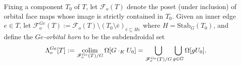 \documentclass[a4paper,10pt,draft]{article}%
\numberwithin{equation}{section}%
\numberwithin{figure}{section}
\begin{document}
\begin{definition}
Fixing a component $T_0$ of $T$,
      let $\mathscr{F}_{o}(T)$ denote the poset (under inclusion) of orbital face maps whose image is
      strictly contained in $T_0$.
      Given an inner edge $e \in T$, let
      $\mathscr{F}_{o}^{Ge}(T) := \mathscr{F}_{o}(T) \setminus (T_0\setminus \bar{e})_{\bar e \subseteq H e}$
      where $H = \mathrm{Stab}_G(T_0)$,
      and define the \textit{$Ge$-orbital horn} to be the subdendroidal set
      \begin{equation}
            \Lambda^{Ge}_{o}[T] := \mathop{\operatorname{colim}}\limits_{\mathscr{F}_{o}^{Ge}(T)/G}\Omega[G\cdot_K U_0]
            =\mathop{\bigcup}\limits_{\mathscr{F}_o^{Ge}(T)/G} \mathop{\bigcup}\limits_{g \in G}\Omega[g U_0]. 
      \end{equation}
\end{definition}
\end{document}
